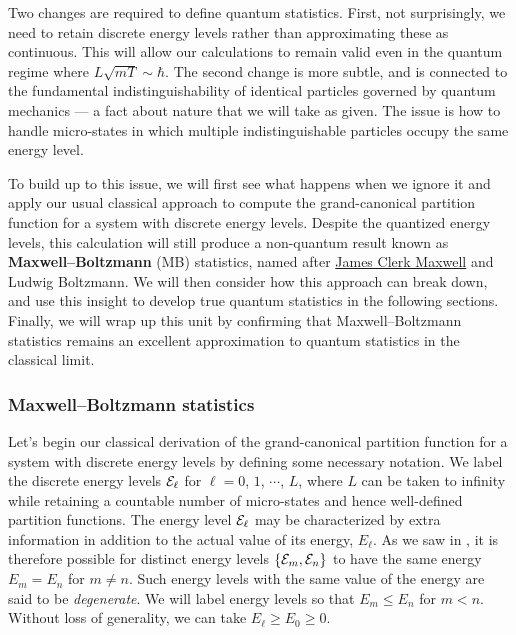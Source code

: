 Two changes are required to define quantum statistics.
First, not surprisingly, we need to retain discrete energy levels rather than approximating these as continuous.
This will allow our calculations to remain valid even in the quantum regime where $L\sqrt{mT} \sim \hbar$.
The second change is more subtle, and is connected to the fundamental indistinguishability of identical particles governed by quantum mechanics --- a fact about nature that we will take as given.
The issue is how to handle micro-states in which multiple indistinguishable particles occupy the same energy level.

To build up to this issue, we will first see what happens when we ignore it and apply our usual classical approach to compute the grand-canonical partition function for a system with discrete energy levels.
Despite the quantized energy levels, this calculation will still produce a non-quantum result known as \textbf{Maxwell--Boltzmann} (MB) statistics, named after \href{https://en.wikipedia.org/wiki/James_Clerk_Maxwell}{James Clerk Maxwell} and Ludwig Boltzmann.
We will then consider how this approach can break down, and use this insight to develop true quantum statistics in the following sections.
Finally, we will wrap up this unit by confirming that Maxwell--Boltzmann statistics remains an excellent approximation to quantum statistics in the classical limit.



\subsubsection{Maxwell--Boltzmann statistics}
Let's begin our classical derivation of the grand-canonical partition function for a system with discrete energy levels by defining some necessary notation.
We label the discrete energy levels $\mathcal E_{\ell}$ for $\ell = 0$, $1$, $\cdots$, $L$, where $L$ can be taken to infinity while retaining a countable number of micro-states and hence well-defined partition functions. %
The energy level $\mathcal E_{\ell}$ may be characterized by extra information in addition to the actual value of its energy, $E_{\ell}$.
As we saw in , it is therefore possible for distinct energy levels $\left\{\mathcal E_m, \mathcal E_n\right\}$ to have the same energy $E_m = E_n$ for $m \neq n$. %
Such energy levels with the same value of the energy are said to be \textit{degenerate}.
We will label energy levels so that $E_m \leq E_n$ for $m < n$.
Without loss of generality, we can take $E_{\ell} \geq E_0 \geq 0$.

